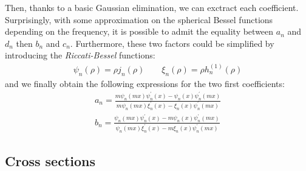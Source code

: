 \documentclass{article}
\numberwithin{equation}{section}
\begin{document}
Then, thanks to a basic Gaussian elimination, we can exctract each coefficient. Surprisingly, with some approximation on the spherical Bessel functions depending on the frequency, it is possible to admit the equality between $a_{n}$ and $d_{n}$ then $b_{n}$ and $c_{n}$. Furthermore, these two factors could be simplified by introducing the \textit{Riccati-Bessel} functions:
\begin{align}
\psi_{n}(\rho)=\rho j_{n}(\rho) \qquad \xi_{n}(\rho)=\rho h^{(1)}_{n}(\rho)
\end{align}
and we finally obtain the following expressions for the two first coefficients:
\begin{equation}\label{eq:an_bn}
\begin{aligned}
a_{n} = \frac{m\psi_{n}(mx)\psi^{'}_{n}(x)-\psi_{n}(x)\psi^{'}_{n}(mx)}{m\psi_{n}(mx)\xi^{'}_{n}(x)-\xi_{n}(x)\psi^{'}_{n}(mx)}\\
b_{n} = \frac{\psi_{n}(mx)\psi^{'}_{n}(x)-m\psi_{n}(x)\psi^{'}_{n}(mx)}{\psi_{n}(mx)\xi^{'}_{n}(x)-m\xi_{n}(x)\psi^{'}_{n}(mx)}
\end{aligned}
\end{equation}

\subsection{Cross sections}
\end{document}
